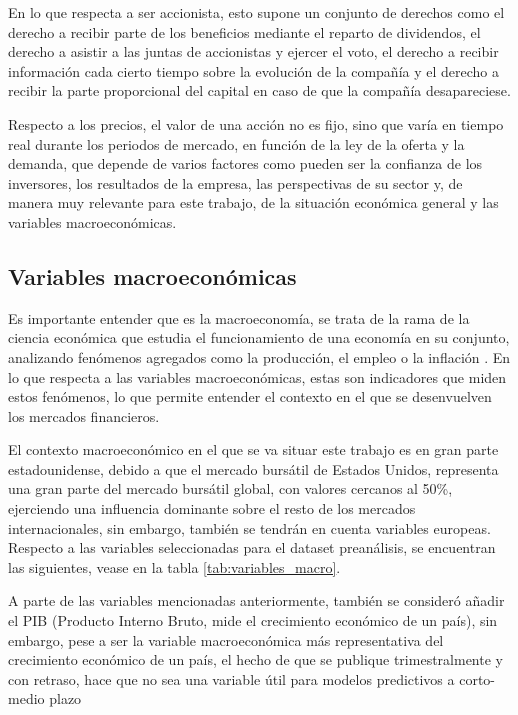 \begin{itemize}
    En lo que respecta a ser accionista, esto supone un conjunto de derechos como el derecho a recibir parte de los beneficios mediante el reparto de dividendos, el derecho a asistir a las juntas de accionistas y ejercer el voto, el derecho a recibir información cada cierto tiempo sobre la evolución de la compañía y el derecho a recibir la parte proporcional del capital en caso de que la compañía desapareciese. 
    
    Respecto a los precios, el valor de una acción no es fijo, sino que varía en tiempo real durante los periodos de mercado, en función de la ley de la oferta y la demanda, que depende de varios factores como pueden ser la confianza de los inversores, los resultados de la empresa, las perspectivas de su sector y, de manera muy relevante para este trabajo, de la situación económica general y las variables macroeconómicas.
\end{itemize}

\subsection{Variables macroeconómicas}
\label{sec:variables_macro}
Es importante entender que es la macroeconomía, se trata de la rama de la ciencia económica que estudia el funcionamiento de una economía en su conjunto, analizando fenómenos agregados como la producción, el empleo o la inflación \cite{unir_macroeconomia}. En lo que respecta a las variables macroeconómicas, estas son indicadores que miden estos fenómenos, lo que permite entender el contexto en el que se desenvuelven los mercados financieros.

El contexto macroeconómico en el que se va  situar este trabajo es en gran parte estadounidense, debido a que el mercado bursátil de Estados Unidos, representa una gran parte del mercado bursátil global, con valores cercanos al 50\%, ejerciendo una influencia dominante sobre el resto de los mercados internacionales, sin embargo, también se tendrán en cuenta variables europeas. Respecto a las variables seleccionadas para el dataset preanálisis, se encuentran las siguientes, vease en la tabla \ref{tab:variables_macro}.

A parte de las variables mencionadas anteriormente, también se consideró añadir el PIB \cite{pib} (Producto Interno Bruto, mide el crecimiento económico de un país), sin embargo, pese a ser la variable macroeconómica más representativa del crecimiento económico de un país, el hecho de que se publique trimestralmente y con retraso, hace que no sea una variable útil para modelos predictivos a corto-medio plazo 

